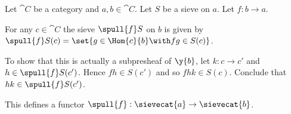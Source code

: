 \begin{definition}
Let $\cat{C}$ be a category
and $a,b \in \cat{C}$.
Let $S$ be a sieve on $a$.
Let $f:b \rightarrow a$.

For any $c \in \cat{C}$ 
the sieve $\spull{f}S$
on $b$ is given by
$\spull{f}S(c) = \set{g \in \Hom{c}{b} \with fg \in S(c)}$.

To show that this is actually a subpresheaf of $\y{b}$,
let $k: c \rightarrow c'$ 
and $h \in \spull{f}S(c')$. 
Hence $fh \in S(c')$ and so $fhk \in S(c)$.
Conclude that $hk \in \spull{f}S(c')$.

This defines a functor $\spull{f}: \sievecat{a} \rightarrow \sievecat{b}$.
\end{definition}